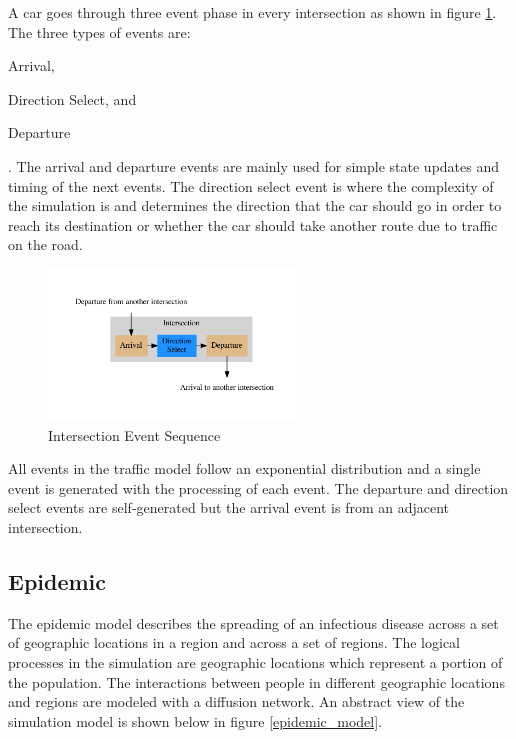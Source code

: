 \documentclass[11pt]{book}
\begin{document}
A car goes through three event phase in every intersection as shown in figure
\ref{traffic_events}. The three types of events are: \begin{inparaenum}[(1)] \item Arrival,
\item Direction Select, and \item Departure \end{inparaenum}. The arrival and departure
events are mainly used for simple state updates and timing of the next events.
The direction select event is where the complexity of the simulation is and determines the
direction that the car should go in order to reach its destination or whether the car should
take another route due to traffic on the road.

\begin{figure}[H]
    \centering
    \includegraphics[width=0.6\textwidth]{figs/graphviz/traffic_events.pdf}
    \caption{Intersection Event Sequence}\label{traffic_events}
\end{figure}

All events in the traffic model follow an exponential distribution and a single event
is generated with the processing of each event. The departure and direction select events
are self-generated but the arrival event is from an adjacent intersection.

\subsection{Epidemic}

The epidemic model describes the spreading of an infectious disease across a set of
geographic locations in a region and across a set of regions. The logical processes in
the simulation are geographic locations which represent a portion of the population. The
interactions between people in different geographic locations and regions are modeled with
a diffusion network. An abstract view of the simulation model is shown below in figure
\ref{epidemic_model}.
\end{document}
